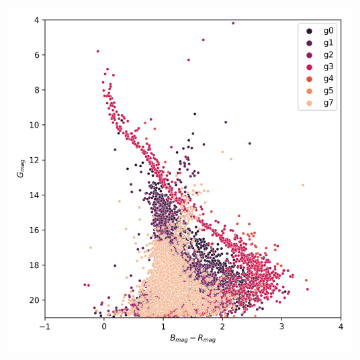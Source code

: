 \documentclass[preprint,12pt,authoryear]{elsarticle}
\begin{document}
\begin{figure}[!hbt]
\begin{subfigure}{0.29\textwidth}
  \end{subfigure}
  \begin{subfigure}{0.29\textwidth}
    \includegraphics[width=\textwidth]{../figures/ngc_2516/dec_hr_diagram_filtered_ngc_2516.png}
  \end{subfigure}


\end{figure}
\end{document}
